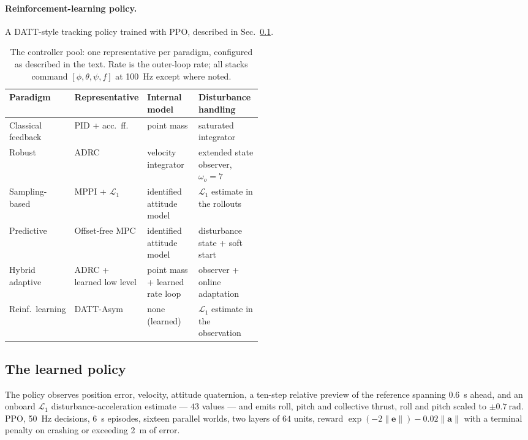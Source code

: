 \paragraph{Reinforcement-learning policy.}
A DATT-style tracking policy\cite{huang2023datt} trained with
PPO\cite{schulman2017ppo}, described in Sec.~\ref{sec:method:policy}.

\begin{table}[t]
\caption{The controller pool: one representative per paradigm, configured as described
in the text. Rate is the outer-loop rate; all stacks command
$[\phi,\theta,\psi,f]$ at \SI{100}{\hertz} except where noted.}
\label{tab:pool}
\begin{center}\small
\begin{tabular}{@{}l l p{0.22\linewidth} p{0.26\linewidth}@{}}
\toprule
Paradigm & Representative & Internal model & Disturbance handling \\
\midrule
Classical feedback     & PID + acc.\ ff.          & point mass & saturated integrator \\
Robust                 & ADRC                     & velocity integrator & extended state observer, $\omega_o = 7$ \\
Sampling-based         & MPPI + $\mathcal{L}_1$   & identified attitude model & $\mathcal{L}_1$ estimate in the rollouts \\
Predictive             & Offset-free MPC          & identified attitude model & disturbance state + soft start \\
Hybrid adaptive        & ADRC + learned low level & point mass + learned rate loop & observer + online adaptation \\
Reinf.\ learning       & DATT-Asym                & none (learned) & $\mathcal{L}_1$ estimate in the observation \\
\bottomrule
\end{tabular}
\end{center}
\end{table}

\subsection{The learned policy}
\label{sec:method:policy}

The policy observes position error, velocity, attitude quaternion, a ten-step relative
preview of the reference spanning \SI{0.6}{\second} ahead, and an onboard
$\mathcal{L}_1$ disturbance-acceleration estimate --- $43$ values --- and emits roll,
pitch and collective thrust, roll and pitch scaled to $\pm\SI{0.7}{\radian}$. PPO,
\SI{50}{\hertz} decisions, \SI{6}{\second} episodes, sixteen parallel worlds, two layers
of $64$ units, reward $\exp(-2\lVert\mathbf{e}\rVert) - 0.02\lVert\mathbf{a}\rVert$ with
a terminal penalty on crashing or exceeding \SI{2}{\meter} of error.

